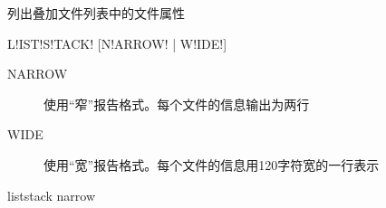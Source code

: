 \label{sss:liststack}

列出叠加文件列表中的文件属性

\begin{SACSTX}
L!IST!S!TACK! [N!ARROW! | W!IDE!]
\end{SACSTX}

\begin{description}
\item [NARROW] 使用``窄''报告格式。每个文件的信息输出为两行
\item [WIDE] 使用``宽''报告格式。每个文件的信息用120字符宽的一行表示
\end{description}

\begin{SACDFT}
liststack narrow
\end{SACDFT}
